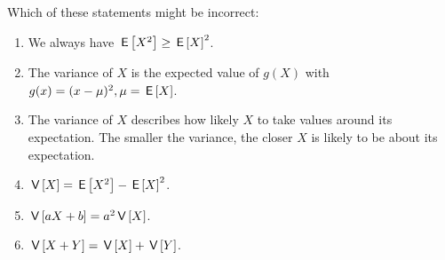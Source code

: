 \documentclass[poll_tutorial_format]{subfiles}
\begin{document}
	
	\begin{exercise}
		Which of these statements might be incorrect: 
		\begin{enumerate}
			\item We always have $\,\mathsf{E}\left[X^2\right] \geq \,\mathsf{E}\left[X\right]^2$.
			\item The variance of $X$ is the expected value of $g(X)$ with $g(x)=(x-\mu)^2, \mu=\,\mathsf{E}\left[X\right]$. 
			\item The variance of $X$ describes how likely $X$ to take values around its expectation. The smaller the variance, the closer $X$ is likely to be about its expectation.
			\item $\,\mathsf{V}\left[X\right]=\,\mathsf{E}\left[X^2\right]-\,\mathsf{E}\left[X\right]^2$. 
			\item $\,\mathsf{V}\left[aX+b\right]=a^2\,\mathsf{V}\left[X\right]$.
			\item $\,\mathsf{V}\left[X+Y\right]=\,\mathsf{V}\left[X\right]+\,\mathsf{V}\left[Y\right]$.
		\end{enumerate}
	\end{exercise}
	
	 
	
	
	
\end{document}
